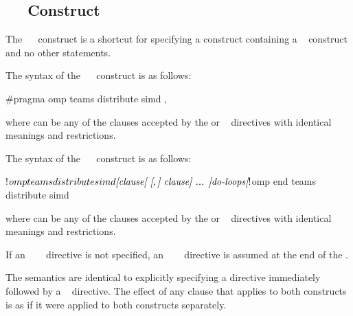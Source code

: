 \subsection{~~ Construct}
\label{subsec:teams distribute simd Construct}
\summary
The ~~ construct is a shortcut for specifying a  construct
containing a ~ construct and no other statements.

\syntax
\begin{ccppspecific}
The syntax of the ~~ construct is as follows:

\begin{ompcPragma}
#pragma omp teams distribute simd \plc{[clause[ [},\plc{] clause] ... ] new-line}
\end{ompcPragma}

where  can be any of the clauses accepted by the  or ~
directives with identical meanings and restrictions.
\end{ccppspecific}

\begin{fortranspecific}
The syntax of the ~~ construct is as follows:

\begin{ompfPragma}
!$omp teams distribute simd \plc{[clause[ [},\plc{] clause] ... ]}
    \plc{do-loops}
\plc{[}!$omp end teams distribute simd\plc{]}
\end{ompfPragma}

where  can be any of the clauses accepted by the  or ~
directives with identical meanings and restrictions.

If an ~~~ directive is
not specified, an ~~~
directive is assumed at the end of the .
\end{fortranspecific}

\descr
The semantics are identical to explicitly specifying a  directive immediately
followed by a ~ directive. The effect of any clause that applies to both constructs is as if it were applied to both constructs separately.


